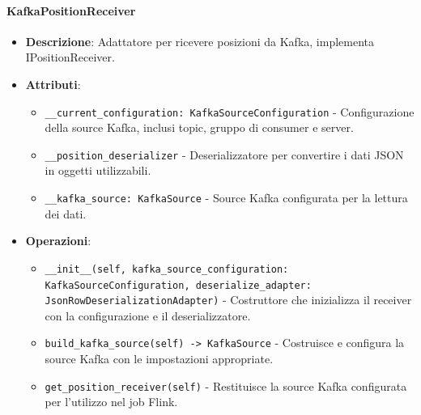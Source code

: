 \documentclass[10pt]{article}
\begin{document}
    \paragraph{KafkaPositionReceiver}
    \begin{itemize}
        \item \textbf{Descrizione}: Adattatore per ricevere posizioni da Kafka, implementa IPositionReceiver.
        \item \textbf{Attributi}:
        \begin{itemize}
            \item \texttt{\_\_current\_configuration: KafkaSourceConfiguration} - Configurazione della source Kafka, inclusi topic, gruppo di consumer e server.
            \item \texttt{\_\_position\_deserializer} - Deserializzatore per convertire i dati JSON in oggetti utilizzabili.
            \item \texttt{\_\_kafka\_source: KafkaSource} - Source Kafka configurata per la lettura dei dati.
        \end{itemize}
        \item \textbf{Operazioni}:
        \begin{itemize}
            \item \texttt{\_\_init\_\_(self, kafka\_source\_configuration: KafkaSourceConfiguration, deserialize\_adapter: JsonRowDeserializationAdapter)} - Costruttore che inizializza il receiver con la configurazione e il deserializzatore.
            \item \texttt{build\_kafka\_source(self) -> KafkaSource} - Costruisce e configura la source Kafka con le impostazioni appropriate.
            \item \texttt{get\_position\_receiver(self)} - Restituisce la source Kafka configurata per l'utilizzo nel job Flink.
        \end{itemize}
    \end{itemize}
\end{document}
